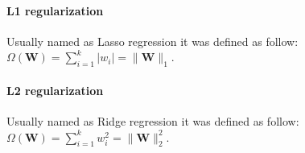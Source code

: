 \paragraph*{L1 regularization}
Usually named as Lasso regression it was defined as follow:
$\Omega(\textbf{W}) = \sum_{i=1}^{k} |w_i| = \|\textbf{W}\|_1$.
\paragraph*{L2 regularization}
Usually named as Ridge regression it was defined as follow:
$\Omega(\textbf{W}) = \sum_{i=1}^{k}w_i^2 = \|\textbf{W}\|_2^2$. 
 
 
